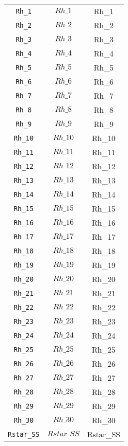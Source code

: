 \begin{center}
\begin{longtable}{ccc}
\texttt{Rh\_1} & $Rh\_1$ & Rh\_1\\
\texttt{Rh\_2} & $Rh\_2$ & Rh\_2\\
\texttt{Rh\_3} & $Rh\_3$ & Rh\_3\\
\texttt{Rh\_4} & $Rh\_4$ & Rh\_4\\
\texttt{Rh\_5} & $Rh\_5$ & Rh\_5\\
\texttt{Rh\_6} & $Rh\_6$ & Rh\_6\\
\texttt{Rh\_7} & $Rh\_7$ & Rh\_7\\
\texttt{Rh\_8} & $Rh\_8$ & Rh\_8\\
\texttt{Rh\_9} & $Rh\_9$ & Rh\_9\\
\texttt{Rh\_10} & $Rh\_10$ & Rh\_10\\
\texttt{Rh\_11} & $Rh\_11$ & Rh\_11\\
\texttt{Rh\_12} & $Rh\_12$ & Rh\_12\\
\texttt{Rh\_13} & $Rh\_13$ & Rh\_13\\
\texttt{Rh\_14} & $Rh\_14$ & Rh\_14\\
\texttt{Rh\_15} & $Rh\_15$ & Rh\_15\\
\texttt{Rh\_16} & $Rh\_16$ & Rh\_16\\
\texttt{Rh\_17} & $Rh\_17$ & Rh\_17\\
\texttt{Rh\_18} & $Rh\_18$ & Rh\_18\\
\texttt{Rh\_19} & $Rh\_19$ & Rh\_19\\
\texttt{Rh\_20} & $Rh\_20$ & Rh\_20\\
\texttt{Rh\_21} & $Rh\_21$ & Rh\_21\\
\texttt{Rh\_22} & $Rh\_22$ & Rh\_22\\
\texttt{Rh\_23} & $Rh\_23$ & Rh\_23\\
\texttt{Rh\_24} & $Rh\_24$ & Rh\_24\\
\texttt{Rh\_25} & $Rh\_25$ & Rh\_25\\
\texttt{Rh\_26} & $Rh\_26$ & Rh\_26\\
\texttt{Rh\_27} & $Rh\_27$ & Rh\_27\\
\texttt{Rh\_28} & $Rh\_28$ & Rh\_28\\
\texttt{Rh\_29} & $Rh\_29$ & Rh\_29\\
\texttt{Rh\_30} & $Rh\_30$ & Rh\_30\\
\texttt{Rstar\_SS} & $Rstar\_SS$ & Rstar\_SS\\
\hline%
\end{longtable}
\end{center}
